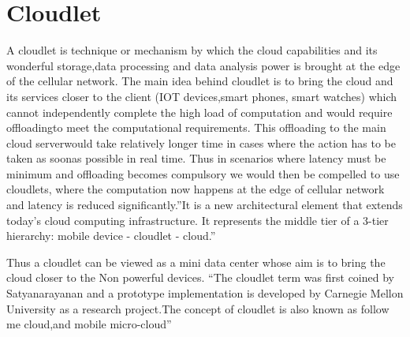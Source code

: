 \section{Cloudlet}


A cloudlet is technique or mechanism by which the cloud capabilities
and its wonderful storage,data processing and data analysis power is
brought at the edge of the cellular network.  The main idea behind
cloudlet is to bring the cloud and its services closer to the
client (IOT devices,smart phones, smart watches) which cannot
independently complete the high load of computation and would require
offloadingto meet the computational requirements. This offloading to
the main cloud serverwould take relatively longer time in cases where
the action has to be taken as soonas possible in real time. Thus in
scenarios where latency must be minimum and offloading becomes
compulsory we would then be compelled to use cloudlets, where the
computation now happens at the edge of cellular network and latency is
reduced significantly.''It is a new architectural element that extends
today’s cloud computing infrastructure.  It represents the middle tier
of a 3-tier hierarchy: mobile device - cloudlet -
cloud.''~\cite{hid-sp18-410-wikiCloudlet}

Thus a cloudlet can be viewed as a mini data center whose aim is to
bring the cloud closer to the Non powerful devices. ``The cloudlet
term was first coined by Satyanarayanan and a prototype implementation
is developed by Carnegie Mellon University as a research project.The
concept of cloudlet is also known as follow me cloud,and mobile
micro-cloud''~\cite{hid-sp18-410-wikiCloudlet}
